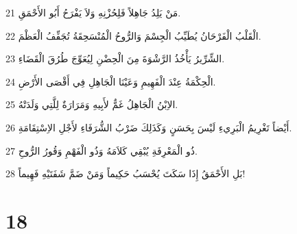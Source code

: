 \par 21 مَنْ يَلِدُ جَاهِلاً فَلِحُزْنِهِ وَلاَ يَفْرَحُ أَبُو الأَحْمَقِ.
\par 22 الْقَلْبُ الْفَرْحَانُ يُطَيِّبُ الْجِسْمَ وَالرُّوحُ الْمُنْسَحِقَةُ تُجَفِّفُ الْعَظْمَ.
\par 23 الشِّرِّيرُ يَأْخُذُ الرَّشْوَةَ مِنَ الْحِضْنِ لِيُعَوِّجَ طُرُقَ الْقَضَاءِ.
\par 24 الْحِكْمَةُ عِنْدَ الْفَهِيمِ وَعَيْنَا الْجَاهِلِ فِي أَقْصَى الأَرْضِ.
\par 25 الاِبْنُ الْجَاهِلُ غَمٌّ لأَبِيهِ وَمَرَارَةٌ لِلَّتِي وَلَدَتْهُ.
\par 26 أَيْضاً تَغْرِيمُ الْبَرِيءِ لَيْسَ بِحَسَنٍ وَكَذَلِكَ ضَرْبُ الشُّرَفَاءِ لأَجْلِ الاِسْتِقَامَةِ.
\par 27 ذُو الْمَعْرِفَةِ يُبْقِي كَلاَمَهُ وَذُو الْفَهْمِ وَقُورُ الرُّوحِ.
\par 28 بَلِ الأَحْمَقُ إِذَا سَكَتَ يُحْسَبُ حَكِيماً وَمَنْ ضَمَّ شَفَتَيْهِ فَهِيماً!

\chapter{18}

